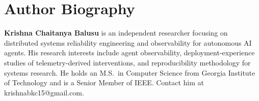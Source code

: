 \documentclass[journal]{IEEEtran}
\begin{document}
\section*{Author Biography}

\textbf{Krishna Chaitanya Balusu} is an independent researcher focusing on
distributed systems reliability engineering and observability for autonomous AI
agents. His research interests include agent observability, deployment-experience
studies of telemetry-derived interventions, and reproducibility methodology for
systems research. He holds an M.S.\ in Computer Science from Georgia Institute
of Technology and is a Senior Member of IEEE. Contact him at krishnabkc15@gmail.com.
\end{document}
